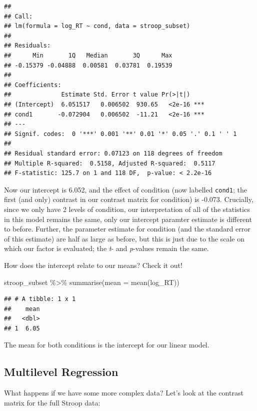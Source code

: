 \documentclass[
]{book}
\newenvironment{Shaded}{\begin{snugshade}}{\end{snugshade}}
\newcommand{\AttributeTok}[1]{\textcolor[rgb]{0.77,0.63,0.00}{#1}}
\newcommand{\FunctionTok}[1]{\textcolor[rgb]{0.00,0.00,0.00}{#1}}
\newcommand{\NormalTok}[1]{#1}
\newcommand{\SpecialCharTok}[1]{\textcolor[rgb]{0.00,0.00,0.00}{#1}}
\begin{document}
\begin{verbatim}
## 
## Call:
## lm(formula = log_RT ~ cond, data = stroop_subset)
## 
## Residuals:
##      Min       1Q   Median       3Q      Max 
## -0.15379 -0.04888  0.00581  0.03781  0.19539 
## 
## Coefficients:
##              Estimate Std. Error t value Pr(>|t|)    
## (Intercept)  6.051517   0.006502  930.65   <2e-16 ***
## cond1       -0.072904   0.006502  -11.21   <2e-16 ***
## ---
## Signif. codes:  0 '***' 0.001 '**' 0.01 '*' 0.05 '.' 0.1 ' ' 1
## 
## Residual standard error: 0.07123 on 118 degrees of freedom
## Multiple R-squared:  0.5158, Adjusted R-squared:  0.5117 
## F-statistic: 125.7 on 1 and 118 DF,  p-value: < 2.2e-16
\end{verbatim}

Now our intercept is 6.052, and the effect of condition (now labelled \texttt{cond1}; the first (and only) contrast in our contrast matrix for condition) is -0.073. Crucially, since we only have 2 levels of condition, our interpretation of all of the statistics in this model remains the same, only our intercept paramter estimate is different to before. Further, the parameter estimate for condition (and the standard error of this estimate) are half as large as before, but this is just due to the scale on which our factor is evaluated; the \emph{t}- and \emph{p}-values remain the same.

How does the intercept relate to our means? Check it out!

\begin{Shaded}
\begin{Highlighting}[]
\NormalTok{stroop\_subset }\SpecialCharTok{\%\textgreater{}\%} \FunctionTok{summarise}\NormalTok{(}\AttributeTok{mean =} \FunctionTok{mean}\NormalTok{(log\_RT))}
\end{Highlighting}
\end{Shaded}

\begin{verbatim}
## # A tibble: 1 x 1
##    mean
##   <dbl>
## 1  6.05
\end{verbatim}

The mean for both conditions is the intercept for our linear model.

\hypertarget{multilevel-regression}{%
\subsection{Multilevel Regression}\label{multilevel-regression}}

What happens if we have some more complex data? Let's look at the contrast matrix for the full Stroop data:
\end{document}
